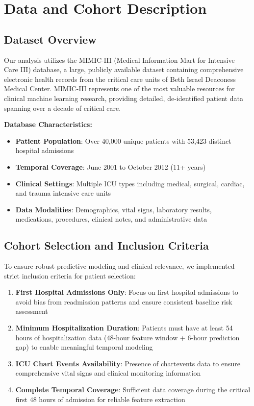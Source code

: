 \documentclass[11pt]{article}
\begin{document}
\section{Data and Cohort Description}

\subsection{Dataset Overview}

Our analysis utilizes the MIMIC-III (Medical Information Mart for Intensive Care III) database, a large, publicly available dataset containing comprehensive electronic health records from the critical care units of Beth Israel Deaconess Medical Center. MIMIC-III represents one of the most valuable resources for clinical machine learning research, providing detailed, de-identified patient data spanning over a decade of critical care.

\textbf{Database Characteristics:}
\begin{itemize}
    \item \textbf{Patient Population}: Over 40,000 unique patients with 53,423 distinct hospital admissions
    \item \textbf{Temporal Coverage}: June 2001 to October 2012 (11+ years)
    \item \textbf{Clinical Settings}: Multiple ICU types including medical, surgical, cardiac, and trauma intensive care units
    \item \textbf{Data Modalities}: Demographics, vital signs, laboratory results, medications, procedures, clinical notes, and administrative data
\end{itemize}

\subsection{Cohort Selection and Inclusion Criteria}

To ensure robust predictive modeling and clinical relevance, we implemented strict inclusion criteria for patient selection:

\begin{enumerate}
    \item \textbf{First Hospital Admissions Only}: Focus on first hospital admissions to avoid bias from readmission patterns and ensure consistent baseline risk assessment
    
    \item \textbf{Minimum Hospitalization Duration}: Patients must have at least 54 hours of hospitalization data (48-hour feature window + 6-hour prediction gap) to enable meaningful temporal modeling
    
    \item \textbf{ICU Chart Events Availability}: Presence of chartevents data to ensure comprehensive vital signs and clinical monitoring information
    
    \item \textbf{Complete Temporal Coverage}: Sufficient data coverage during the critical first 48 hours of admission for reliable feature extraction
\end{enumerate}
\end{document}
